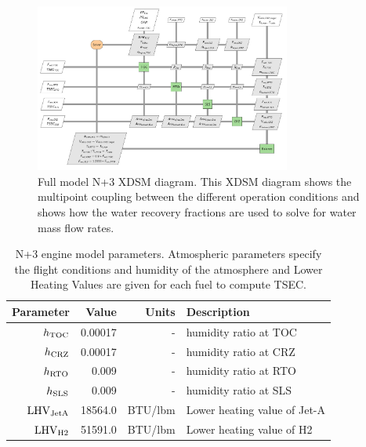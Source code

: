 \documentclass[conf]{new-aiaa}
\begin{document}
\begin{figure}[hbt!]
    \centering
    \includegraphics[width=0.75\textwidth]{N3_xdsm_full.pdf}
    \caption{
        Full model N+3 XDSM diagram.
        This XDSM diagram shows the multipoint coupling between the different operation conditions and shows how the water recovery fractions are used to solve for water mass flow rates.
    }
    \label{fig:N3_xdsm_full}
\end{figure}

\begin{table}[hbt!]
    \centering
    \caption{
        N+3 engine model parameters.
        Atmospheric parameters specify the flight conditions and humidity of the atmosphere and Lower Heating Values are given for each fuel to compute TSEC.}
    \begin{tabular}{r r r l}
        \hline
        Parameter              & Value   & Units          & Description                                     \\
        \hline
        $h_{\rm{TOC}}$         & 0.00017 & -              & humidity ratio at TOC \cite{Kalnay1996}         \\
        $h_{\rm{CRZ}}$         & 0.00017 & -              & humidity ratio at CRZ \cite{Kalnay1996}         \\
        $h_{\rm{RTO}}$         & 0.009   & -              & humidity ratio at RTO \cite{Kalnay1996}         \\
        $h_{\rm{SLS}}$         & 0.009   & -              & humidity ratio at SLS \cite{Kalnay1996}         \\
        $\rm{LHV}_{\rm{JetA}}$ & 18564.0 & \unit{BTU/lbm} & Lower heating value of Jet-A \cite{Lawicki2002} \\
        $\rm{LHV}_{\rm{H2}}$   & 51591.0 & \unit{BTU/lbm} & Lower heating value of H2 \cite{toolbox2003}    \\
        \hline
    \end{tabular}
    \label{engine_params}
\end{table}
\end{document}
